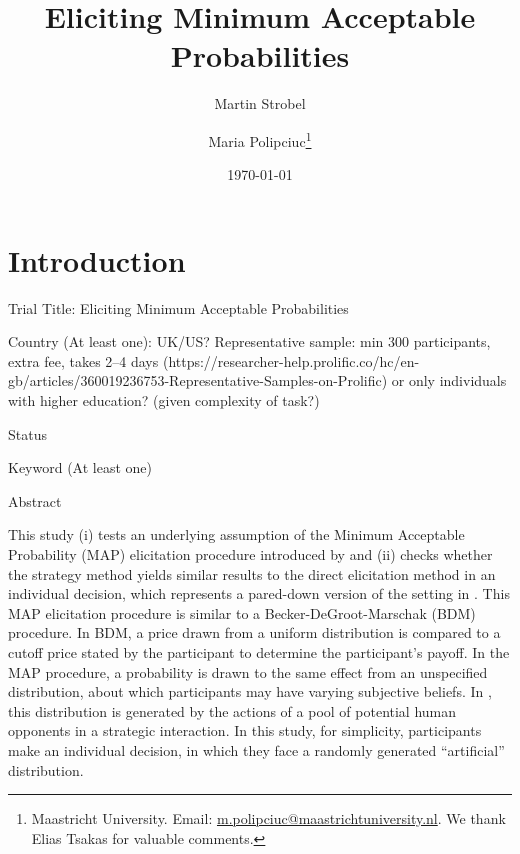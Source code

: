 \usepackage{preliminary}

\title{Eliciting Minimum Acceptable Probabilities}
\author{Martin Strobel  \and Maria Polipciuc\thanks{Maastricht University. Email: \url{m.polipciuc@maastrichtuniversity.nl}. We thank Elias Tsakas for valuable comments.}}
\date{\today	\vspace{1cm}}
\titlepage



\begin{titlepage}
\clearpage\maketitle
\thispagestyle{empty}

\end{titlepage}


\section{Introduction}\label{sec:intro}


    Trial Title: Eliciting Minimum Acceptable Probabilities
    
    Country (At least one): UK/US? Representative sample: min 300 participants, extra fee, takes 2--4 days (https://researcher-help.prolific.co/hc/en-gb/articles/360019236753-Representative-Samples-on-Prolific) or only individuals with higher education? (given complexity of task?)
    
    Status
    
    Keyword (At least one)
    
    Abstract
    
This study (i) tests an underlying assumption of the Minimum Acceptable Probability (MAP) elicitation procedure introduced by \cite{Bohnet2004} and (ii) checks whether the strategy method yields similar results to the direct elicitation method in an individual decision, which represents a pared-down version of the setting in \cite{Bohnet2004}.
This MAP elicitation procedure is similar to a Becker-DeGroot-Marschak (BDM) procedure.
In BDM, a price drawn from a uniform distribution is compared to a cutoff price stated by the participant to determine the participant's payoff.
In the MAP procedure, a probability is drawn to the same effect from an unspecified distribution, about which participants may have varying subjective beliefs.
In \cite{Bohnet2004}, this distribution is generated by the actions of a pool of potential human opponents in a strategic interaction.
In this study, for simplicity, participants make an individual decision, in which they face a randomly generated ``artificial'' distribution.


